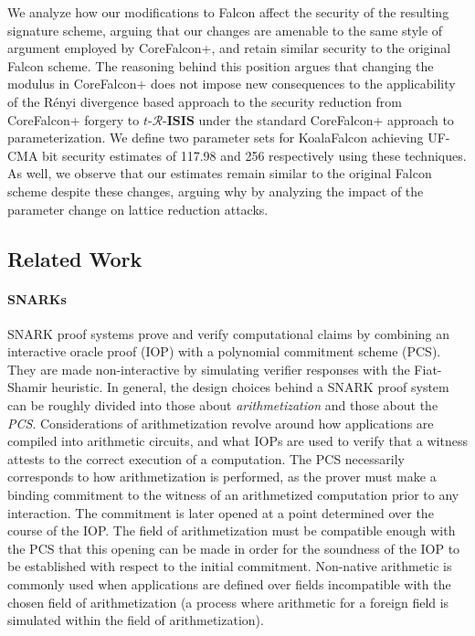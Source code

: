 We analyze how our modifications to Falcon affect the security of the resulting signature 
scheme, arguing that our changes are amenable to the same style of argument employed by 
CoreFalcon+, and retain similar security to the original Falcon scheme. The reasoning behind 
this position argues that changing the modulus in CoreFalcon+ does not impose new consequences to 
the applicability of the Rényi divergence based approach to the security reduction from CoreFalcon+ 
forgery to $t\text{-}\mathcal{R}\text{-}\mathbf{ISIS}$ under the standard CoreFalcon+ approach to 
parameterization. We define two parameter sets for KoalaFalcon achieving UF-CMA bit security estimates 
of 117.98 and 256 respectively using these techniques. As well, we observe that our estimates remain 
similar to the original Falcon scheme despite these changes, arguing why by analyzing the impact of the 
parameter change on lattice reduction attacks.

\subsection{Related Work}

\paragraph{SNARKs} 

SNARK proof systems prove and verify computational claims by combining an interactive oracle proof 
(IOP) with a polynomial commitment scheme (PCS). They are made non-interactive by simulating 
verifier responses with the Fiat-Shamir heuristic. In general, the design choices behind a 
SNARK proof system can be roughly divided into those about \emph{arithmetization} and those 
about the \emph{PCS}. Considerations of arithmetization revolve around how applications are 
compiled into arithmetic circuits, and what IOPs are used to verify that a witness attests to the 
correct execution of a computation. The PCS necessarily corresponds to how 
arithmetization is performed, as the prover must make a binding commitment to the witness of 
an arithmetized computation prior to any interaction. The commitment is later opened at a point 
determined over the course of the IOP. The field of arithmetization must be compatible enough 
with the PCS that this opening can be made in order for the soundness of the IOP to be established 
with respect to the initial commitment. Non-native arithmetic is commonly used when applications are 
defined over fields incompatible with the chosen field of arithmetization (a process where 
arithmetic for a foreign field is simulated within the field of arithmetization).

